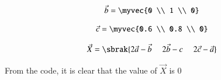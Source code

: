 \documentclass[journal]{IEEEtran}
\begin{document}
\begin{align}
\vec{b} = \myvec{0 \\ 1 \\ 0}
\end{align}

\begin{align}
\vec{c} = \myvec{0.6 \\ 0.8 \\ 0}
\end{align}

\begin{align}
\vec{X} = \sbrak{2\vec{a}-\vec{b} \;\quad 2\vec{b}-c \;\quad 2\vec{c}-\vec{a}} 
\end{align}

From the code, it is clear that the value of $\vec{X}$ is $0$
\end{document}
